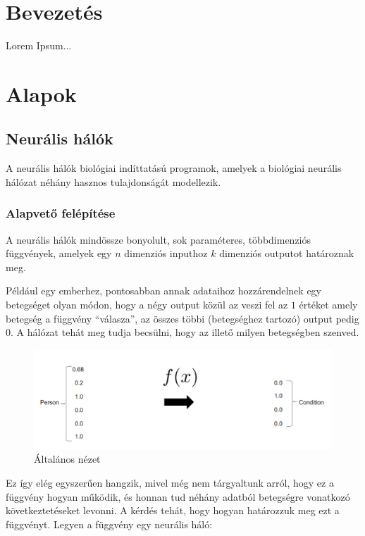 \documentclass[12pt]{article}
\begin{document}
\section{Bevezetés}

Lorem Ipsum...

\section{Alapok}

\subsection{Neurális hálók}

A neurális hálók biológiai indíttatású programok, amelyek a biológiai neurális hálózat néhány hasznos tulajdonságát modellezik.

\subsubsection{Alapvető felépítése}

A neurális hálók mindössze bonyolult, sok paraméteres, többdimenziós függvények, amelyek egy $n$ dimenziós inputhoz $k$ dimenziós outputot határoznak meg.

Például egy emberhez, pontosabban annak adataihoz hozzárendelnek egy betegséget olyan módon, hogy a négy output közül az veszi fel az $1$ értéket amely betegség a függvény “válasza”, az összes többi (betegséghez tartozó) output pedig $0$. A hálózat tehát meg tudja becsülni, hogy az illető milyen betegségben szenved.

\begin{figure}[h!]
  \includegraphics[width=\linewidth]{fgv.png}
  \caption{Általános nézet}
\end{figure}

Ez így elég egyszerűen hangzik, mivel még nem tárgyaltunk arról, hogy ez a függvény hogyan működik, és honnan tud néhány adatból betegségre vonatkozó következtetéseket levonni. A kérdés tehát, hogy hogyan határozzuk meg ezt a függvényt. Legyen a függvény egy neurális háló:
\end{document}
